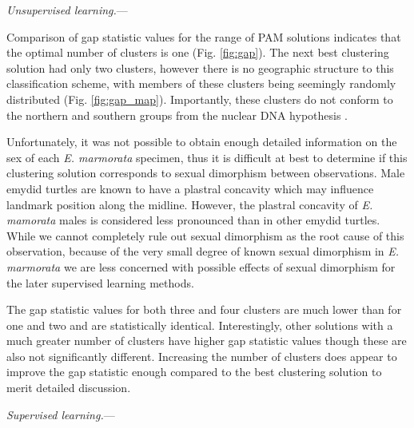 \documentclass[12pt,letterpaper]{article}\usepackage{graphicx, color}
\renewcommand{\subsubsection}[1]{%
\vspace{2ex}
\noindent
\textit{#1.}---}
\begin{document}
\subsubsection{Unsupervised learning}

Comparison of gap statistic values for the range of PAM solutions indicates that the optimal number of clusters is one (Fig. \ref{fig:gap}). The next best clustering solution had only two clusters, however there is no geographic structure to this classification scheme, with members of these clusters being seemingly randomly distributed (Fig. \ref{fig:gap_map}). Importantly, these clusters do not conform to the northern and southern groups from the nuclear DNA hypothesis \citep{Spinks2010}.

Unfortunately, it was not possible to obtain enough detailed information on the sex of each \textit{E. marmorata} specimen, thus it is difficult at best to determine if this clustering solution corresponds to sexual dimorphism between observations. Male emydid turtles are known to have a plastral concavity which may influence landmark position along the midline. However, the plastral concavity of \textit{E. mamorata} males is considered less pronounced than in other emydid turtles. While we cannot completely rule out sexual dimorphism as the root cause of this observation, because of the very small degree of known sexual dimorphism in \textit{E. marmorata} we are less concerned with possible effects of sexual dimorphism for the later supervised learning methods. 

The gap statistic values for both three and four clusters are much lower than for one and two and are statistically identical. Interestingly, other solutions with a much greater number of clusters have higher gap statistic values though these are also not significantly different. Increasing the number of clusters does appear to improve the gap statistic enough compared to the best clustering solution to merit detailed discussion.


\subsubsection{Supervised learning}
\end{document}
